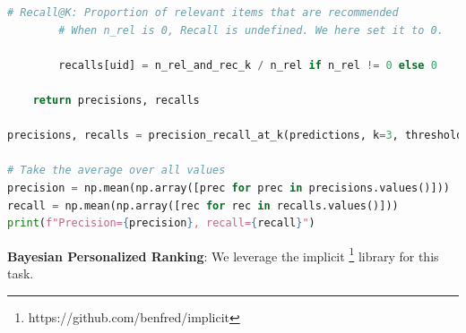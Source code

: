 \documentclass{article}
\begin{document}
\begin{lstlisting}[language=Python]
        # Recall@K: Proportion of relevant items that are recommended
        # When n_rel is 0, Recall is undefined. We here set it to 0.

        recalls[uid] = n_rel_and_rec_k / n_rel if n_rel != 0 else 0

    return precisions, recalls

precisions, recalls = precision_recall_at_k(predictions, k=3, threshold=4)

# Take the average over all values
precision = np.mean(np.array([prec for prec in precisions.values()]))
recall = np.mean(np.array([rec for rec in recalls.values()]))
print(f"Precision={precision}, recall={recall}")
\end{lstlisting}

\textbf{Bayesian Personalized Ranking}: We leverage the implicit \footnote{https://github.com/benfred/implicit} library for this task.
\end{document}
